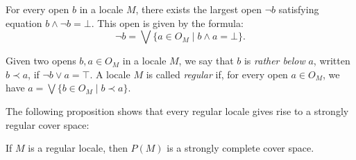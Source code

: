 \documentclass[reqno]{amsart}
\theoremstyle{definition}
\theoremstyle{remark}
\numberwithin{figure}{section}
\newcommand{\rb}{\prec}
\begin{document}
For every open $b$ in a locale $M$, there exists the largest open $\neg b$ satisfying equation $b \wedge \neg b = \bot$.
This open is given by the formula:
\[ \neg b = \bigvee \{ a \in O_M \mid b \wedge a = \bot \}. \]

\begin{defn}
Given two opens $b,a \in O_M$ in a locale $M$, we say that $b$ is \emph{rather below} $a$, written $b \rb a$, if $\neg b \vee a = \top$.
A locale $M$ is called \emph{regular} if, for every open $a \in O_M$, we have $a = \bigvee \{ b \in O_M \mid b \rb a \}$.
\end{defn}

The following proposition shows that every regular locale gives rise to a strongly regular cover space:

\begin{prop}
If $M$ is a regular locale, then $P(M)$ is a strongly complete cover space.
\end{prop}
\end{document}
